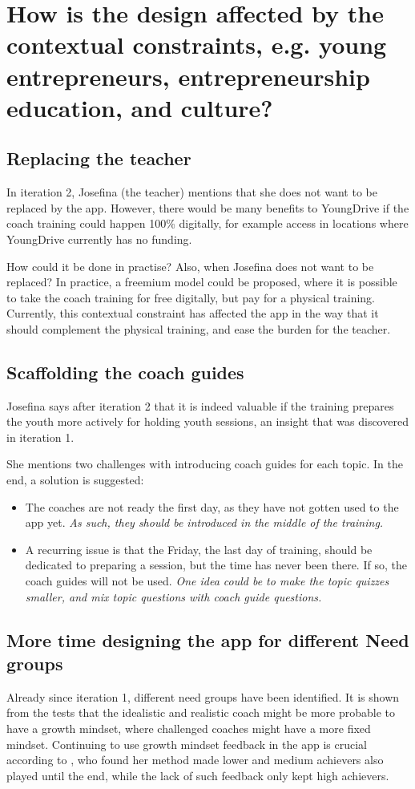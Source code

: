 \section{How is the design affected by the contextual constraints, e.g. young entrepreneurs, entrepreneurship education, and culture?}

\subsection{Replacing the teacher}
In iteration 2, Josefina (the teacher) mentions that she does not want to be replaced by the app. However, there would be many benefits to YoungDrive if the coach training could happen 100\% digitally, for example access in locations where YoungDrive currently has no funding.

How could it be done in practise? Also, when Josefina does not want to be replaced? In practice, a freemium model could be proposed, where it is possible to take the coach training for free digitally, but pay for a physical training. Currently, this contextual constraint has affected the app in the way that it should complement the physical training, and ease the burden for the teacher.

\subsection{Scaffolding the coach guides}
Josefina says after iteration 2 that it is indeed valuable if the training prepares the youth more actively for holding youth sessions, an insight that was discovered in iteration 1.

She mentions two challenges with introducing coach guides for each topic. In the end, a solution is suggested:
\begin{itemize}
\item The coaches are not ready the first day, as they have not gotten used to the app yet. \textit{As such, they should be introduced in the middle of the training.}
\item A recurring issue is that the Friday, the last day of training, should be dedicated to preparing a session, but the time has never been there. If so, the coach guides will not be used. \textit{One idea could be to make the topic quizzes smaller, and mix topic questions with coach guide questions.}
\end{itemize}

\subsection{More time designing the app for different Need groups}
Already since iteration 1, different need groups have been identified. It is shown from the tests that the idealistic and realistic coach might be more probable to have a growth mindset, where challenged coaches might have a more fixed mindset. Continuing to use growth mindset feedback in the app is crucial according to \cite{dweck-youtube}, who found her method made lower and medium achievers also played until the end, while the lack of such feedback only kept high achievers.


